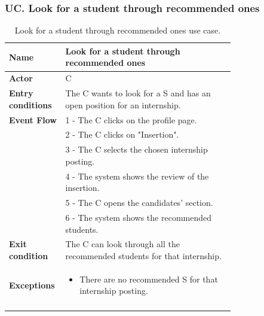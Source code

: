 \subsubsection*{UC\cuc . Look for a student through recommended ones}
\begin{center}
    \begin{longtable}{|l|p{0.75\linewidth}|}
        \hline
        \textbf{Name}               & Look for a student through recommended ones\\
        \hline
        \textbf{Actor}              & C\\
        \hline
        \textbf{Entry conditions}   & The C wants to look for a S and has an open position for an internship.\\
        \hline
        \textbf{Event Flow}         & 1 - The C clicks on the profile page. \\
        & 2 - The C clicks on "Insertion". \\
        & 3 - The C selects the chosen internship posting. \\
        & 4 - The system shows the review of the insertion. \\
        & 5 - The C opens the candidates’ section. \\
        & 6 - The system shows the recommended students. \\
        \hline
        \textbf{Exit condition}   & The C can look through all the recommended students for that internship. \\       
        \hline
        \textbf{Exceptions}       & \begin{itemize}
            \item There are no recommended S for that internship posting.
        \end{itemize}\\
        \hline
        \caption{Look for a student through recommended ones use case.}
        \label{tab: look_for_student_use_case}
    \end{longtable}
\end{center}


